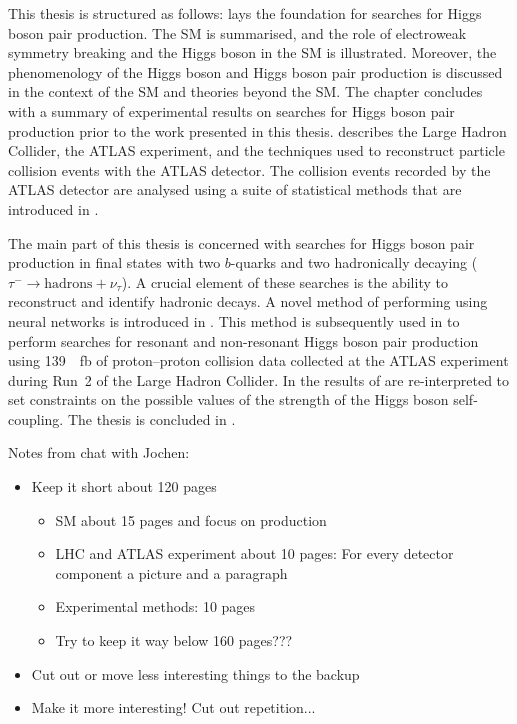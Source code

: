 This thesis is structured as follows:  lays the
foundation for searches for Higgs boson pair production. The SM is summarised,
and the role of electroweak symmetry breaking and the Higgs boson in the SM is
illustrated. Moreover, the phenomenology of the Higgs boson and Higgs boson pair
production is discussed in the context of the SM and theories beyond the SM. The
chapter concludes with a summary of experimental results on searches for Higgs
boson pair production prior to the work presented in this thesis.
 describes the Large Hadron Collider, the ATLAS
experiment, and the techniques used to reconstruct particle collision events
with the ATLAS detector. The collision events recorded by the ATLAS detector are
analysed using a suite of statistical methods that are introduced in
.

The main part of this thesis is concerned with searches for Higgs boson pair
production in final states with two $b$-quarks and two hadronically decaying
\tauleptons ($\tau^{-} \to \text{hadrons} + \nu_\tau$). A crucial element of
these searches is the ability to reconstruct and identify hadronic \taulepton
decays. A novel method of performing \tauid using neural networks is
introduced in . This method is subsequently used in
 to perform searches for resonant and non-resonant Higgs boson
pair production using \SI{139}{\per\femto\barn} of proton--proton collision data
collected at the ATLAS experiment during Run~2 of the Large Hadron Collider. In
 the results of  are
re-interpreted to set constraints on the possible values of the strength of the
Higgs boson self-coupling. The thesis is concluded in .

\clearpage



Notes from chat with Jochen:
\begin{itemize}

\item Keep it short \ra about 120 pages
  \begin{itemize}
  \item SM about 15 pages and focus on \HH production

  \item LHC and ATLAS experiment about 10 pages: For every detector
    component a picture and a paragraph

  \item Experimental methods: 10 pages

  \item Try to keep it way below 160 pages???
  \end{itemize}

\item Cut out or move less interesting things to the backup

\item Make it more interesting! Cut out repetition...

\end{itemize}



